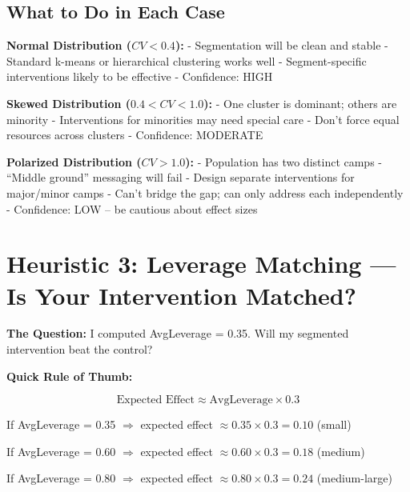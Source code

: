 \subsection{What to Do in Each Case}

\textbf{Normal Distribution ($CV < 0.4$):}
- Segmentation will be clean and stable
- Standard k-means or hierarchical clustering works well
- Segment-specific interventions likely to be effective
- Confidence: HIGH

\textbf{Skewed Distribution ($0.4 < CV < 1.0$):}
- One cluster is dominant; others are minority
- Interventions for minorities may need special care
- Don't force equal resources across clusters
- Confidence: MODERATE

\textbf{Polarized Distribution ($CV > 1.0$):}
- Population has two distinct camps
- ``Middle ground'' messaging will fail
- Design separate interventions for major/minor camps
- Can't bridge the gap; can only address each independently
- Confidence: LOW -- be cautious about effect sizes


\section{Heuristic 3: Leverage Matching --- Is Your Intervention Matched?}
\label{sec:h3-leverage-matching}

\textbf{The Question:} I computed AvgLeverage = 0.35. Will my segmented intervention beat the control?

\textbf{Quick Rule of Thumb:}

\begin{center}
\begin{tcolorbox}[colback=blue!10!white, colframe=blue!75!black]

$$\text{Expected Effect} \approx \text{AvgLeverage} \times 0.3$$

If AvgLeverage = 0.35 $\Rightarrow$ expected effect $\approx 0.35 \times 0.3 = 0.10$ (small)

If AvgLeverage = 0.60 $\Rightarrow$ expected effect $\approx 0.60 \times 0.3 = 0.18$ (medium)

If AvgLeverage = 0.80 $\Rightarrow$ expected effect $\approx 0.80 \times 0.3 = 0.24$ (medium-large)

\end{tcolorbox}
\end{center}

